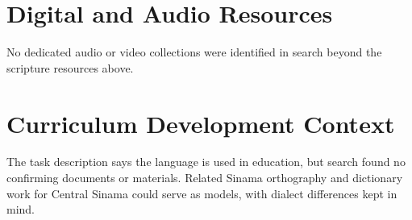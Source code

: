\documentclass[12pt]{article}
\begin{document}
\section{Digital and Audio Resources}
No dedicated audio or video collections were identified in search beyond the scripture resources above.

\section{Curriculum Development Context}
The task description says the language is used in education, but search found no confirming documents or materials. Related Sinama orthography and dictionary work for Central Sinama could serve as models, with dialect differences kept in mind.
\end{document}
